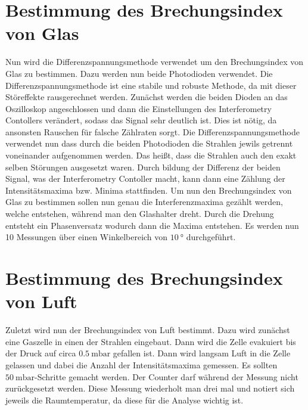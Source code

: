 \section{Bestimmung des Brechungsindex von Glas}
\label{sec:n_glas}
Nun wird die Differenzspannungsmethode verwendet um den Brechungsindex von Glas zu bestimmen. Dazu werden nun beide Photodioden verwendet. Die Differenzspannungsmethode ist eine stabile
und robuste Methode, da mit dieser Störeffekte rausgerechnet werden. Zunächst werden die beiden Dioden an das Oszilloskop angeschlossen und dann die Einstellungen des Interferometry 
Contollers verändert, sodass das Signal sehr deutlich ist. Dies ist nötig, da ansonsten Rauschen für falsche Zählraten sorgt. Die Differenzspannungsmethode verwendet nun dass durch
die beiden Photodioden die Strahlen jewils getrennt voneinander aufgenommen werden. Das heißt, dass die Strahlen auch den exakt selben Störungen ausgesetzt waren. Durch bildung der 
Differenz der beiden Signal, was der Interferometry Contoller macht, kann dann eine Zählung der Intensitätsmaxima bzw. Minima stattfinden. Um nun den Brechungsindex von Glas zu bestimmen 
sollen nun genau die Interferenzmaxima gezählt werden, welche entstehen, während man den Glashalter dreht. Durch die Drehung entsteht ein Phasenversatz wodurch dann die Maxima entstehen.
Es werden nun 10 Messungen über einen Winkelbereich von $\qty{10}{\degree}$ durchgeführt.

\section{Bestimmung des Brechungsindex von Luft}
\label{sec:n_luft}
Zuletzt wird nun der Brechungsindex von Luft bestimmt. Dazu wird zunächst eine Gaszelle in einen der Strahlen eingebaut. Dann wird die Zelle evakuiert bis der Druck auf circa $\qty{0.5}{\milli\bar}$
gefallen ist. Dann wird langsam Luft in die Zelle gelassen und dabei die Anzahl der Intensitätsmaxima gemessen. Es sollten $\qty{50}{\milli\bar}$-Schritte gemacht werden. Der Counter darf 
während der Messung nicht zurückgesetzt werden. Diese Messung wiederholt man drei mal und notiert sich jeweils die Raumtemperatur, da diese für die Analyse wichtig ist.\cite{v64}
